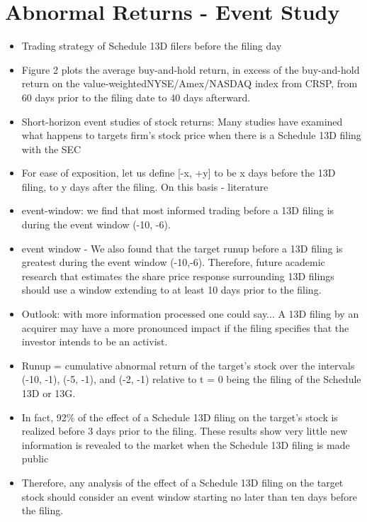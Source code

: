 \documentclass[12pt]{article}
\begin{document}
\section{Abnormal Returns - Event Study} 
    \begin{itemize}
        \item Trading strategy of Schedule 13D filers before the filing day \citet{Collin-Dufresne2015}
        \item Figure 2 plots the average buy-and-hold return, in excess of the buy-and-hold return on the value-weightedNYSE/Amex/NASDAQ index from CRSP, from 60 days prior to the filing date to 40 days afterward.\citet{Collin-Dufresne2015}
        \item Short-horizon event studies of stock returns: Many studies have examined what happens to targets firm’s stock price when there is a Schedule 13D filing with the SEC \citet{CoffeeJr.2014}
        \item For ease of exposition, let us define [-x, +y] to be x days before the 13D filing, to y days after the filing. On this basis - literature \citet{CoffeeJr.2014}
        \item event-window: we find that most informed trading before a 13D filing is during the event window (-10, -6).\citet{Brigida2012}
        \item event window - We also found that the target runup before a 13D filing is greatest during the event window (-10,-6). Therefore, future academic research that estimates the share price response surrounding 13D filings should use a window extending to at least 10 days prior to the filing. \citet{Brigida2012}
        \item Outlook: with more information processed one could say... A 13D filing by an acquirer may have a more pronounced impact if the filing specifies that the investor intends to be an activist. \citet{Brigida2012}
        \item Runup = cumulative abnormal return of the target’s stock over the intervals (-10, -1), (-5, -1), and (-2, -1) relative to t = 0 being the filing of the Schedule 13D or 13G. \citet{Brigida2012}
        \item In fact, 92\% of the effect of a Schedule 13D filing on the target’s stock is realized before 3 days prior to the filing. These results show very little new information is revealed to the market when the Schedule 13D filing is made public \citet{Brigida2012}
        \item Therefore, any analysis of the effect of a Schedule 13D filing on the target stock should consider an event window starting no later than ten days before the filing. \citet{Brigida2012}

\end{itemize}
\end{document}
